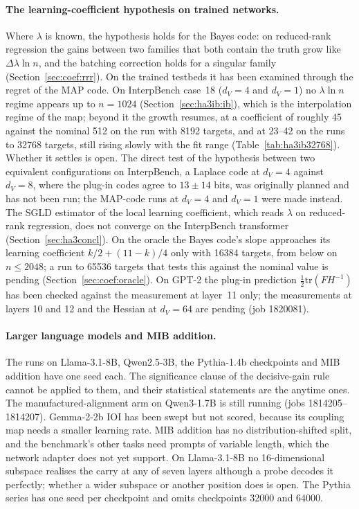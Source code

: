 \documentclass[11pt,a4paper]{article}
\newcommand{\dv}{d_V}
\begin{document}
\paragraph{The learning-coefficient hypothesis on trained networks.} Where $\lambda$ is known, the hypothesis holds for the Bayes code: on reduced-rank regression the gains between two families that both contain the truth grow like $\Delta\lambda\ln n$, and the batching correction holds for a singular family (Section~\ref{sec:coef:rrr}). On the trained testbeds it has been examined through the regret of the MAP code. On InterpBench case~18 ($\dv=4$ and $\dv=1$) no $\lambda\ln n$ regime appears up to $n=1024$ (Section~\ref{sec:ha3ib:ib}), which is the interpolation regime of the map; beyond it the growth resumes, at a coefficient of roughly 45 against the nominal 512 on the run with 8192 targets, and at 23--42 on the runs to 32768 targets, still rising slowly with the fit range (Table~\ref{tab:ha3ib32768}). Whether it settles is open. The direct test of the hypothesis between two equivalent configurations on InterpBench, a Laplace code at $\dv=4$ against $\dv=8$, where the plug-in codes agree to $13\pm14$ bits, was originally planned and has not been run; the MAP-code runs at $\dv=4$ and $\dv=1$ were made instead. The SGLD estimator of the local learning coefficient, which reads $\lambda$ on reduced-rank regression, does not converge on the InterpBench transformer (Section~\ref{sec:ha3concl}). On the oracle the Bayes code's slope approaches its learning coefficient $k/2+(11-k)/4$ only with 16384 targets, from below on $n\le2048$; a run to 65536 targets that tests this against the nominal value is pending (Section~\ref{sec:coef:oracle}). On GPT-2 the plug-in prediction $\tfrac12\mathrm{tr}(FH^{-1})$ has been checked against the measurement at layer~11 only; the measurements at layers 10 and 12 and the Hessian at $\dv=64$ are pending (job 1820081).

\paragraph{Larger language models and MIB addition.} The runs on Llama-3.1-8B, Qwen2.5-3B, the Pythia-1.4b checkpoints and MIB addition have one seed each. The significance clause of the decisive-gain rule cannot be applied to them, and their statistical statements are the anytime ones. The manufactured-alignment arm on Qwen3-1.7B is still running (jobs 1814205--1814207). Gemma-2-2b IOI has been swept but not scored, because its coupling map needs a smaller learning rate. MIB addition has no distribution-shifted split, and the benchmark's other tasks need prompts of variable length, which the network adapter does not yet support. On Llama-3.1-8B no 16-dimensional subspace realises the carry at any of seven layers although a probe decodes it perfectly; whether a wider subspace or another position does is open. The Pythia series has one seed per checkpoint and omits checkpoints 32000 and 64000.
\end{document}
